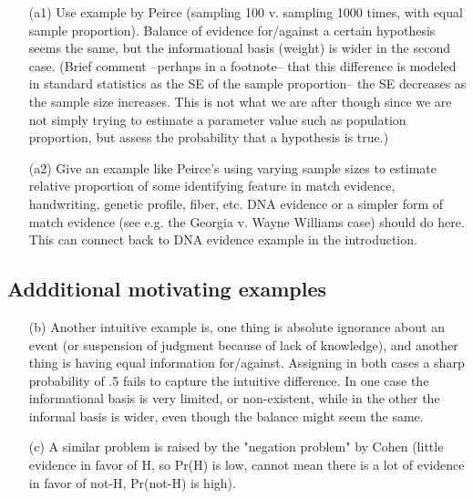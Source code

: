 \documentclass[
  10pt,
  dvipsnames,enabledeprecatedfontcommands]{scrartcl}
\begin{document}
\begin{itemize}

\item[(a1)] Use example by Peirce (sampling 100 v. sampling 1000 times, with equal sample proportion). Balance of evidence for/against a certain hypothesis seems the same, but the informational basis (weight) is wider in the second case.
(Brief comment --perhaps in a footnote-- that this difference is modeled in standard statistics as the SE of the sample proportion-- the SE decreases as the sample size increases. This is not what we are after though since we are not simply trying to estimate a parameter value such as population proportion, but assess the probability that a hypothesis is true.) 

\item[(a2)] Give an example like Peirce's using varying sample sizes to estimate relative proportion of some identifying feature in match evidence, handwriting, genetic profile, fiber, etc. DNA evidence or a simpler form of match evidence (see e.g. the Georgia v. Wayne Williams case) should do here. This can connect back to DNA evidence example in the introduction.

\end{itemize}

\hypertarget{addditional-motivating-examples}{%
\subsection{Addditional motivating
examples}\label{addditional-motivating-examples}}

\begin{itemize}

\item[(b)] Another intuitive example is, one thing is absolute ignorance about an event (or suspension of judgment because of lack of knowledge), and another thing is having equal information for/against. Assigning in both cases a sharp probability of .5 fails to capture the intuitive difference. In one case the informational basis is very limited, or non-existent, while in the other the informal basis is wider, even though the balance might seem the same. 

\item[(c)] A similar problem is raised by the "negation problem" by Cohen (little evidence in favor of H, so Pr(H) is low, cannot mean there is a lot of evidence in favor of not-H, Pr(not-H) is high). 

\end{itemize}
\end{document}
